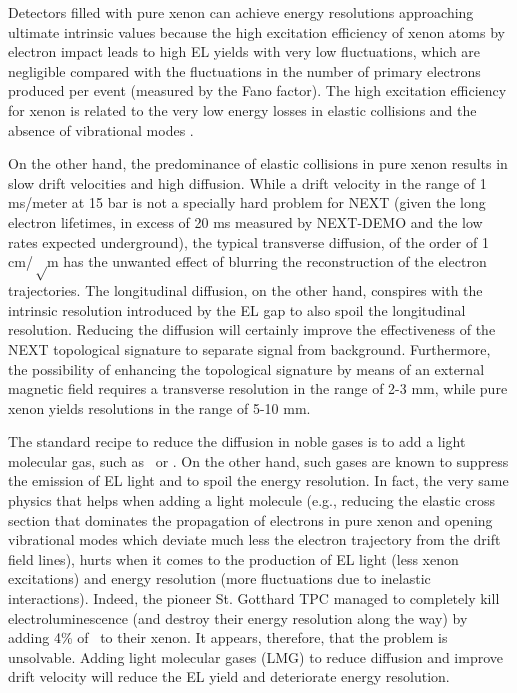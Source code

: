\documentclass{JINST}
\begin{document}
Detectors filled with pure xenon can achieve energy resolutions approaching ultimate intrinsic values  because the high excitation efficiency of xenon atoms by electron impact leads to high EL yields with very low fluctuations, which are negligible compared with the fluctuations in the number of primary electrons produced per event (measured by the Fano factor). The high excitation efficiency for xenon is related to the very low energy losses in elastic collisions and the absence of vibrational modes \cite{Freitas:2010zza}. 

On the other hand, the predominance of elastic collisions in pure xenon results in slow drift velocities and high diffusion. While a drift velocity in the range of 1 ms/meter at 15 bar is not a specially hard problem for NEXT (given the long electron lifetimes, in excess of 20 ms measured by NEXT-DEMO and the low rates expected underground), the typical transverse diffusion, of the order of 1 cm/$\sqrt$m has the unwanted effect of blurring the reconstruction of the electron trajectories. The longitudinal diffusion, on the other hand, conspires with the intrinsic resolution introduced by the EL gap to also spoil the longitudinal resolution. Reducing the diffusion will certainly improve the effectiveness of the NEXT topological signature to separate signal from background. Furthermore, the possibility of enhancing the topological signature by means of an external magnetic field requires a transverse resolution in the range of 2-3 mm, while pure xenon yields resolutions in the range of 5-10 mm. 

The standard recipe to reduce the diffusion in noble gases is to add a light molecular gas, such as \CHF\ or \COT. On the other hand, such gases are known to suppress the emission of EL light and to spoil the energy resolution. In fact, the very same physics that helps when adding a light molecule (e.g., reducing the elastic cross section that dominates the propagation of electrons in pure xenon and opening vibrational modes which deviate much less the electron trajectory from the drift field lines), hurts when it comes to the production of EL light (less xenon excitations) and energy resolution (more fluctuations due to inelastic interactions). Indeed, the pioneer St. Gotthard TPC \cite{Luscher:1998sd,Luscher:1998pq} managed to completely kill electroluminescence (and destroy their energy resolution along the way) by adding 4\% of \CHF\ to their xenon. It appears, therefore, that the problem is unsolvable. Adding light molecular gases (LMG) to reduce diffusion and improve drift velocity will reduce the EL yield and deteriorate energy resolution. 
\end{document}
